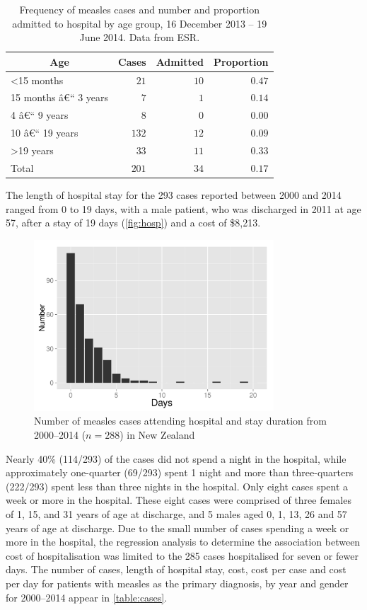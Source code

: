 \documentclass{article}
\begin{document}
\begin{table}
\begin{center}
\begin{tabular}{lrrr}
\hline\hline
\multicolumn{1}{c}{Age}&\multicolumn{1}{c}{Cases}&\multicolumn{1}{c}{Admitted}&\multicolumn{1}{c}{Proportion}\tabularnewline
\hline
\textless 15 months&$ 21$&$10$&$0.47$\tabularnewline
15 months â€“ 3 years&$  7$&$ 1$&$0.14$\tabularnewline
4 â€“ 9 years&$  8$&$ 0$&$0.00$\tabularnewline
10 â€“ 19 years&$132$&$12$&$0.09$\tabularnewline
\textgreater 19 years&$ 33$&$11$&$0.33$\tabularnewline
Total&$201$&$34$&$0.17$\tabularnewline
\hline
\end{tabular}\end{center}\caption{Frequency of measles cases and number and proportion admitted to hospital by age group, 16 December 2013 -- 19 June 2014. Data from ESR.}
\label{table:freq}
\end{table}

The length of hospital stay for the 293 cases reported between 2000 and 2014 ranged from 0 to 19 days, with a male patient, who was discharged in 2011 at age 57, after a stay of 19 days (\autoref{fig:hosp}) and a cost of \$8,213.

\begin{figure}
\begin{center}
     \includegraphics[width=0.8\textwidth]{p.pdf}
\end{center}
\caption{Number of measles cases attending hospital and stay duration from 2000--2014 ($n=288$) in New Zealand}
\label{fig:hosp}
\end{figure}

Nearly 40\% (114/293) of the cases did not spend a night in the hospital, while approximately one-quarter (69/293) spent 1 night and more than three-quarters (222/293) spent less than three nights in the hospital. Only eight cases spent a week or more in the hospital. These eight cases were comprised of three females of 1, 15, and 31 years of age at discharge, and 5 males aged 0, 1, 13, 26 and 57 years of age at discharge. Due to the small number of cases spending a week or more in the hospital, the regression analysis to determine the association between cost of hospitalisation was limited to the 285 cases hospitalised for seven or fewer days. The number of cases, length of hospital stay, cost, cost per case and cost per day for patients with measles as the primary diagnosis, by year and gender for 2000--2014 appear in \autoref{table:cases}.
\end{document}
